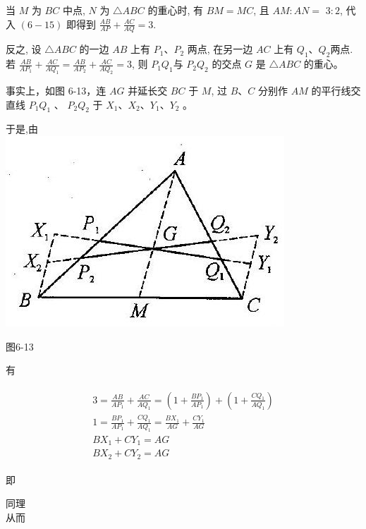 \documentclass[10pt]{article}
\begin{document}
当 $M$ 为 $B C$ 中点, $N$ 为 $\triangle A B C$ 的重心时, 有 $B M=M C$, 且 $A M: A N=$ $3: 2$, 代入 $(6-15)$ 即得到 $\frac{A B}{A P}+\frac{A C}{A Q}=3$.

反之, 设 $\triangle A B C$ 的一边 $A B$ 上有 $P_{1} 、 P_{2}$ 两点, 在另一边 $A C$ 上有 $Q_{1} 、 Q_{2}$两点. 若 $\frac{A B}{A P_{1}}+\frac{A C}{A Q_{1}}=\frac{A B}{A P_{2}}+\frac{A C}{A Q_{2}}=3$, 则 $P_{1} Q_{1}$与 $P_{2} Q_{2}$ 的交点 $G$ 是 $\triangle A B C$ 的重心。

事实上，如图 6-13，连 $A G$ 并延长交 $B C$ 于 $M$, 过 $B 、 C$ 分别作 $A M$ 的平行线交直线 $P_{1} Q_{1}$ 、 $P_{2} Q_{2}$ 于 $X_{1} 、 X_{2} 、 Y_{1} 、 Y_{2}$ 。

于是,由\\
\includegraphics[max width=\textwidth, center]{2024_10_30_2c8f45efd4a519b08e1ag-066}

图6-13

有

\begin{align*}
\begin{gathered}
3=\frac{A B}{A P_{1}}+\frac{A C}{A Q_{1}}=\left(1+\frac{B P_{1}}{A P_{1}}\right)+\left(1+\frac{C Q_{1}}{A Q_{1}}\right) \\
1=\frac{B P_{1}}{A P_{1}}+\frac{C Q_{1}}{A Q_{1}}=\frac{B X_{1}}{A G}+\frac{C Y_{1}}{A G} \\
B X_{1}+C Y_{1}=A G \\
B X_{2}+C Y_{2}=A G
\end{gathered}
\end{align*}

即

同理\\
从而
\end{document}
